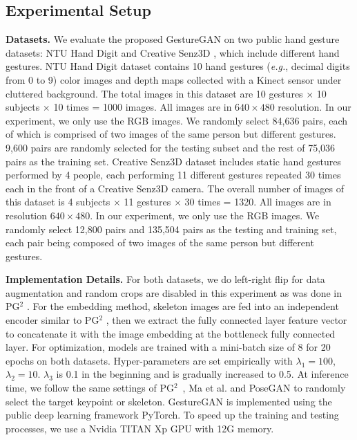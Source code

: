 \documentclass[sigconf]{acmart}
\begin{document}
\subsection{Experimental Setup}
\noindent \textbf{Datasets.}
We evaluate the proposed GestureGAN on two public hand gesture datasets: NTU Hand Digit \cite{ren2013robust} and Creative Senz3D \cite{memo2016head}, which include different hand gestures.
NTU Hand Digit dataset \cite{ren2013robust} contains 10 hand gestures (\textit{e.g.}, decimal digits from 0 to 9) color images
and depth maps collected with a Kinect sensor under cluttered background.
The total images in this dataset are 10 gestures $\times$ 10 subjects ${\times}$ 10 times = 1000 images.
All images are in $640 {\times} 480$ resolution.
In our experiment, we only use the RGB images.
We randomly select 84,636 pairs, each of which is comprised of two images of the same person but different gestures.
9,600 pairs are randomly selected for the testing subset and the rest of 75,036 pairs as the training set.
Creative Senz3D dataset \cite{memo2016head} includes static hand gestures performed by 4 people, each performing 11 different gestures repeated 30 times each in
the front of a Creative Senz3D camera.
The overall number of images of this dataset is 4 subjects $\times$ 11 gestures $\times$ 30 times = 1320.
All images are in resolution $640 {\times} 480$.
In our experiment, we only use the RGB images.
We randomly select 12,800 pairs and 135,504 pairs as the testing and training set, each pair being composed of two images of the same person but different gestures.

\noindent\textbf{Implementation Details.}
For both datasets, we do left-right flip for data augmentation and random crops are disabled in this experiment as was done in PG$^2$ \cite{ma2017pose}.
For the embedding method, skeleton images are fed into an independent encoder similar to PG$^2$ \cite{ma2017pose},  then we extract the fully connected layer feature vector to concatenate it with the image embedding at the bottleneck fully connected layer.
For optimization, models are trained with a mini-batch size of 8 for 20 epochs on both datasets.
Hyper-parameters are set empirically with $\lambda_1{=}100$,  $\lambda_2{=}10$.
$\lambda_3$ is 0.1 in the beginning and is gradually increased to 0.5.
At inference time, we follow the same settings of PG$^2$~\cite{ma2017pose}, Ma et al. \cite{ma2017disentangled} and PoseGAN \cite{siarohin2017deformable} to randomly select the target keypoint or skeleton.
GestureGAN is implemented using the public deep learning framework PyTorch.
To speed up the training and testing processes, we use a Nvidia TITAN Xp GPU with 12G memory.
\end{document}
